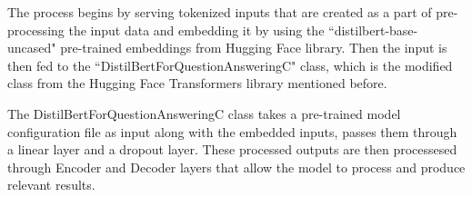 \documentclass[a4paper,12pt]{report}
\begin{document}
            The process begins by serving tokenized inputs that are created as a part of pre-processing the input data and embedding it by using the ``distilbert-base-uncased" pre-trained embeddings from Hugging Face library. Then the input is then fed to the ``DistilBertForQuestionAnsweringC" class, which is the modified class from the Hugging Face Transformers library mentioned before.

            The DistilBertForQuestionAnsweringC class takes a pre-trained model configuration file as input along with the embedded inputs, passes them through a linear layer and a dropout layer. These processed outputs are then processesed through Encoder and Decoder layers that allow the model to process and produce relevant results.

                             	\begin{figure}[!h]
                             		\begin{center}
\end{center}
\end{figure}
\end{document}
